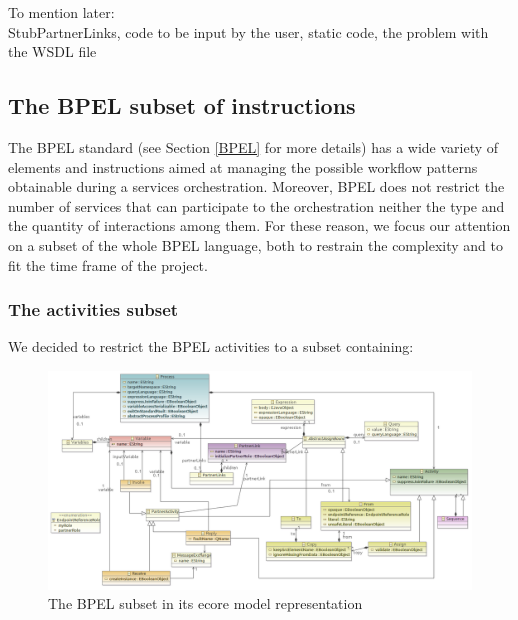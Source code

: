  To mention later: \\
 StubPartnerLinks, code to be input by the user, static code, the problem with the WSDL file

\subsection{The BPEL subset of instructions}
\label{Sec:BPELsubset}
The BPEL standard (see Section \ref{BPEL} for more details) has a wide variety of elements and instructions aimed at managing the possible workflow patterns obtainable during a services orchestration. Moreover, BPEL does not restrict the number of services that can participate to the orchestration neither the type and the quantity of interactions among them.
For these reason, we focus our attention on a subset of the whole BPEL language, both to restrain the complexity and to fit the time frame of the project.
\subsubsection{The activities subset}
We decided to restrict the BPEL activities to a subset containing:


\begin{figure}
  \begin{center}
    \includegraphics[scale=0.67,angle=90]{pictures/SubSetBpel2.png}
    \caption{The BPEL subset in its ecore model representation}
    \label{fig:SubSetBPEL}
  \end{center}
\end{figure} 



